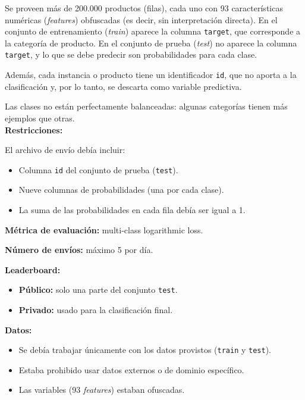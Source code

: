 \documentclass[12pt]{article}%
\begin{document}
Se proveen más de 200.000 productos (filas), cada uno con 93 características 
numéricas (\textit{features}) obfuscadas (es decir, sin interpretación directa). 
En el conjunto de entrenamiento (\textit{train}) aparece la columna \texttt{target}, %
que corresponde a la categoría de producto. En el conjunto de prueba (\textit{test}) 
no aparece la columna \texttt{target}, y lo que se debe predecir son probabilidades 
para cada clase. 

Además, cada instancia o producto tiene un identificador \texttt{id}, que no aporta 
a la clasificación y, por lo tanto, se descarta como variable predictiva. 

Las clases no están perfectamente balanceadas: algunas categorías tienen más 
ejemplos que otras.\\[0.5cm]

\textbf{\large Restricciones: }

El archivo de envío debía incluir:
\begin{itemize} %
    \item Columna \texttt{id} del conjunto de prueba (\texttt{test}).
    \item Nueve columnas de probabilidades (una por cada clase).
    \item La suma de las probabilidades en cada fila debía ser igual a 1.
\end{itemize} %

\textbf{Métrica de evaluación:} multi-class logarithmic loss.  

\textbf{Número de envíos:} máximo 5 por día.  

\textbf{Leaderboard:}
\begin{itemize}
    \item \textbf{Público:} solo una parte del conjunto \texttt{test}.
    \item \textbf{Privado:} usado para la clasificación final.
\end{itemize}

\textbf{Datos:}
\begin{itemize}
    \item Se debía trabajar únicamente con los datos provistos (\texttt{train} y \texttt{test}).
    \item Estaba prohibido usar datos externos o de dominio específico.
    \item Las variables (93 \textit{features}) estaban ofuscadas.
\end{itemize}
\end{document}
